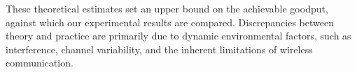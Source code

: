        These theoretical estimates set an upper bound on the achievable goodput, against which our experimental results are compared. 
        Discrepancies between theory and practice are primarily due to dynamic environmental factors, such as interference, channel variability, and the inherent limitations of wireless communication.
